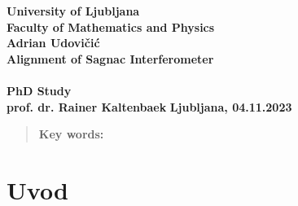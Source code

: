 \documentclass{article}
\begin{document}
\begin{titlepage}
	\begin{center}
		{\large \textbf{University of Ljubljana}} \\[0.1cm]
		{\large \textbf{Faculty of Mathematics and Physics}}
		\\[0.5cm]
		\vspace{2cm}
		{\LARGE \textbf{Adrian Udovičić}}\\[2.5cm]
		{\Huge \textbf{Alignment of Sagnac Interferometer}}\\[0.5cm]
		{\Huge \textbf{ }}\\[2cm]
		{\LARGE\textbf{PhD Study}}\\[2.5cm]
		\vspace{1.5cm}
		\hfill \large\textbf{prof. dr. Rainer Kaltenbaek}
		\vfill
		\large\textbf{{Ljubljana, 04.11.2023}}
	\end{center}
\end{titlepage}

\newpage
{}
\tableofcontents
\newpage
{}
\begin{abstract}
	\textbf{Key words:}
\end{abstract}
\newpage
{}
\section{Uvod}



\listoftables
\listoffigures
\end{document}
